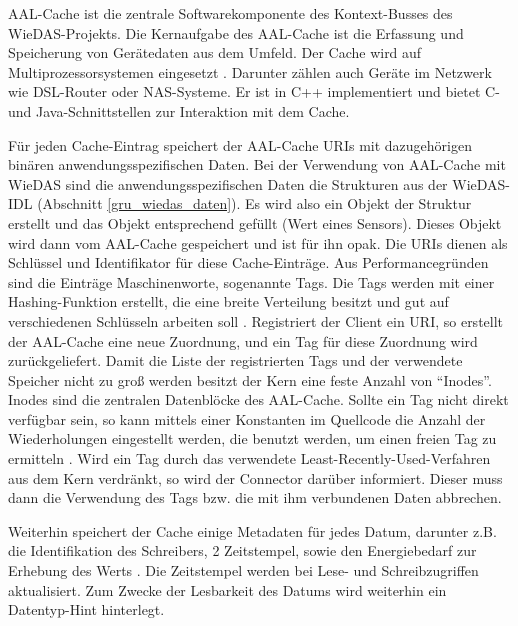 AAL-Cache ist die zentrale Softwarekomponente des Kontext-Busses des WieDAS-Projekts.
Die Kernaufgabe des AAL-Cache ist die Erfassung und Speicherung von Gerätedaten aus dem Umfeld.
Der Cache wird auf Multiprozessorsystemen eingesetzt \cite{aalcache}.
Darunter zählen auch Geräte im Netzwerk wie DSL-Router oder NAS-Systeme.
Er ist in C++ implementiert und bietet C- und Java-Schnittstellen zur Interaktion mit dem Cache.

Für jeden Cache-Eintrag speichert der AAL-Cache URIs mit dazugehörigen binären anwendungsspezifischen
Daten.
Bei der Verwendung von AAL-Cache mit WieDAS sind die anwendungsspezifischen Daten die Strukturen
aus der WieDAS-IDL (Abschnitt \ref{gru_wiedas_daten}).
Es wird also ein Objekt der Struktur erstellt und das Objekt entsprechend gefüllt (Wert eines Sensors).
Dieses Objekt wird dann vom AAL-Cache gespeichert und ist für ihn opak.
Die URIs dienen als Schlüssel und Identifikator für diese Cache-Einträge.
Aus Performancegründen sind die Einträge Maschinenworte, sogenannte Tags.
Die Tags werden mit einer Hashing-Funktion erstellt, die eine breite Verteilung besitzt
und gut auf verschiedenen Schlüsseln arbeiten soll \cite{aalc_hash}.
Registriert der Client ein URI, so erstellt der AAL-Cache eine neue Zuordnung, und ein Tag
für diese Zuordnung wird zurückgeliefert.
Damit die Liste der registrierten Tags und der verwendete Speicher nicht zu groß werden
besitzt der Kern eine feste Anzahl von ``Inodes''.
Inodes sind die zentralen Datenblöcke des AAL-Cache.
Sollte ein Tag nicht direkt verfügbar sein, so kann mittels einer Konstanten im Quellcode
die Anzahl der Wiederholungen eingestellt werden, die benutzt werden, um einen freien Tag zu ermitteln
\cite{aalcache}.
Wird ein Tag durch das verwendete Least-Recently-Used-Verfahren aus dem Kern verdränkt, so wird
der Connector darüber informiert.
Dieser muss dann die Verwendung des Tags bzw. die mit ihm verbundenen Daten abbrechen.

Weiterhin speichert der Cache einige Metadaten für jedes Datum, darunter z.B. die Identifikation
des Schreibers, 2 Zeitstempel, sowie den Energiebedarf zur Erhebung des Werts \cite{aalcache}.
Die Zeitstempel werden bei Lese- und Schreibzugriffen aktualisiert.
Zum Zwecke der Lesbarkeit des Datums wird weiterhin ein Datentyp-Hint hinterlegt.

